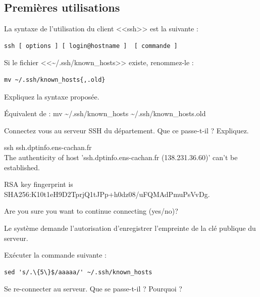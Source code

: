 \documentclass[11pt]{article}
\begin{document}
\subsection{Premières utilisations}

La syntaxe de l'utilisation du client <<ssh>> est la suivante :

\begin{lstlisting}
ssh [ options ] [ login@hostname ]  [ commande ]
\end{lstlisting}

Si le fichier <<\textasciitilde{}/.ssh/known\_hosts>> existe, renommez-le :

\begin{lstlisting}
mv ~/.ssh/known_hosts{,.old}
\end{lstlisting}

Expliquez la syntaxe proposée.

\begin{solution}

Équivalent de : mv \textasciitilde{}/.ssh/known\_hosts \textasciitilde{}/.ssh/known\_hosts.old
\end{solution}

Connectez vous au serveur SSH du département. Que ce passe-t-il ? Expliquez.

\begin{solution}

ssh ssh.dptinfo.ens-cachan.fr\\

The authenticity of host 'ssh.dptinfo.ens-cachan.fr (138.231.36.60)' can't be established.

RSA key fingerprint is SHA256:K10t1eH9D2TprjQ1tJPp+h0dz08/uFQMAdPmuPsVvDg.

Are you sure you want to continue connecting (yes/no)? 

Le système demande l'autorisation d'enregistrer l'empreinte de la clé publique du serveur.

\end{solution}


Exécuter la commande suivante :

\begin{verbatim}
sed 's/.\{5\}$/aaaaa/' ~/.ssh/known_hosts
\end{verbatim}

Se re-connecter au serveur. Que se passe-t-il ? Pourquoi ?
\end{document}
